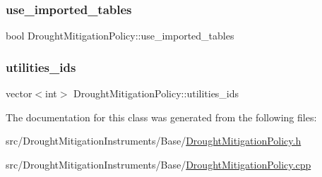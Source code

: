 \subsubsection{\texorpdfstring{use\+\_\+imported\+\_\+tables}{use\_imported\_tables}}
{\footnotesize\ttfamily bool Drought\+Mitigation\+Policy\+::use\+\_\+imported\+\_\+tables\hspace{0.3cm}{\ttfamily [protected]}}

\mbox{\label{classDroughtMitigationPolicy_ad19fbc5a9fdf17ed50c0ba0b99d47eca_ad19fbc5a9fdf17ed50c0ba0b99d47eca}} 
\subsubsection{\texorpdfstring{utilities\+\_\+ids}{utilities\_ids}}
{\footnotesize\ttfamily vector$<$int$>$ Drought\+Mitigation\+Policy\+::utilities\+\_\+ids\hspace{0.3cm}{\ttfamily [protected]}}



The documentation for this class was generated from the following files\+:\begin{DoxyCompactItemize}
\item 
src/\+Drought\+Mitigation\+Instruments/\+Base/\mbox{\hyperlink{DroughtMitigationPolicy_8h}{Drought\+Mitigation\+Policy.\+h}}\item 
src/\+Drought\+Mitigation\+Instruments/\+Base/\mbox{\hyperlink{DroughtMitigationPolicy_8cpp}{Drought\+Mitigation\+Policy.\+cpp}}\end{DoxyCompactItemize}
